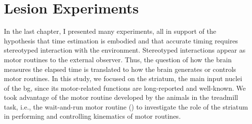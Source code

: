 \chapter{Lesion Experiments} \label{ch:lesion}
In the last chapter, I presented many experiments, all in support of the hypothesis that time estimation is embodied and that accurate timing requires stereotyped interaction with the environment.
Stereotyped interactions appear as motor routines to the external observer.
Thus, the question of how the brain measures the elapsed time is translated to how the brain generates or controls motor routines.
In this study, we focused on the striatum, the main input nuclei of the \gls{bg}, since its motor-related functions are long-reported and well-known.
We took advantage of the motor routine developed by the animals in the treadmill task, i.e., the wait-and-run motor routine () to investigate the role of the striatum in performing and controlling kinematics of motor routines.

